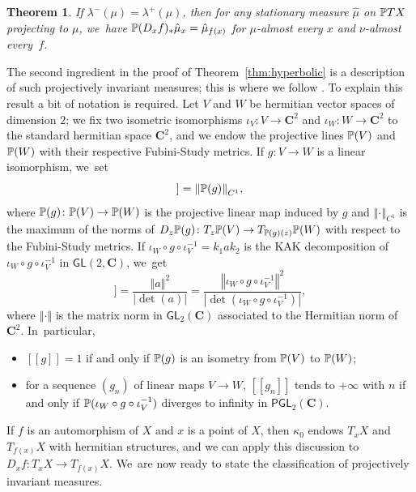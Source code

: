 \documentclass[11pt]{article}
\newcommand{\llbracket}{[\![}
\newcommand{\rrbracket}{]\!]}
\newcommand{\norm}[1]{{\left\Vert#1\right\Vert}}
\newcommand{\abs}[1]{\left\vert#1\right\vert}
\def\C{\mathbf{C}}
\newcommand\PGL{{\mathsf{PGL}}}
\newcommand\GL{{\mathsf{GL}}}
\theoremstyle{plain}
\newtheorem{thm}{Theorem}[section]
\theoremstyle{definition}
\numberwithin{equation}{section}
\begin{document}
\begin{thm}\label{thm:ledrappier_invariance_principle}
If $\lambda^{-}(\mu) = \lambda^{+}(\mu)$, then for any stationary measure $\hat \mu$ on $\P TX$ projecting to $\mu$, we~have $\P(D_xf)_\varstar \hat\mu_x = \hat\mu_{f(x)}$
for $\mu$-almost every $x$ and $\nu$-almost every~$f$.
\end{thm}

The second ingredient in the proof of Theorem~\ref{thm:hyperbolic} is
a description of such projectively invariant measures; this is where we follow \cite{barrientos-malicet}.
To explain this result a bit of notation is required. Let $V$ and $W$ be hermitian vector spaces of dimension $2$;
we fix two isometric isomorphisms $\iota_V\colon V\to \C^2$ and $\iota_W\colon W\to \C^2$ to the standard
hermitian space $\C^2$, and we endow the projective lines $\P(V)$ and $\P(W)$ with their respective Fubini-Study metrics. If $g\colon V\to W$
is a linear isomorphism, we~set
\begin{equation*}
\llbracket g \rrbracket= \norm{ \P (g) }_{C^1},
\end{equation*}
where $\P(g) \colon \P(V)\to \P(W)$
is the projective linear map induced by $g$ and $\norm{\cdot}_{C^1}$
is the maximum of the norms of $D_z\P(g) \colon T_z\P(V)\to T_{\P (g)(z)}\P(W)$ with respect to the Fubini-Study metrics.
If $\iota_W\circ g\circ \iota_V^{-1} = k_1ak_2$ is the KAK decomposition of
$\iota_W\circ g\circ \iota_V^{-1}$ in $\GL(2, \C)$, we~get
\begin{equation*}
\llbracket g \rrbracket = \frac{\norm{a}^2}{\abs{\det(a)}} = \frac{\norm{\iota_W\circ g\circ \iota_V^{-1}}^2}{\abs{\det(\iota_W\circ g\circ \iota_V^{-1})}},
\end{equation*}
where
$\norm{\cdot}$ is the matrix norm in $\GL_2(\C)$ associated to the Hermitian norm of $\C^2$. In~particular,
\begin{itemize}
\item[(a)] $\llbracket g \rrbracket=1$ if and only if $\P (g)$ is an isometry from $\P(V)$ to $\P(W)$;
\item[(b)] for a sequence $(g_n)$ of linear maps $V\to W$,
$\llbracket g_n\rrbracket$ tends to $+\infty$ with $n$ if and only if $\P(\iota_W\circ g\circ \iota_V^{-1})$
diverges to infinity in $\PGL_2(\C)$.
\end{itemize}
If $f$ is an automorphism of $X$ and $x$ is a point of $X$, then $\kappa_0$ endows $T_xX$ and $T_{f(x)}X$ with
hermitian structures, and we can apply this discussion to $D_xf\colon T_xX\to T_{f(x)}X$. We~are now ready to state the classification of projectively invariant measures.
\end{document}
